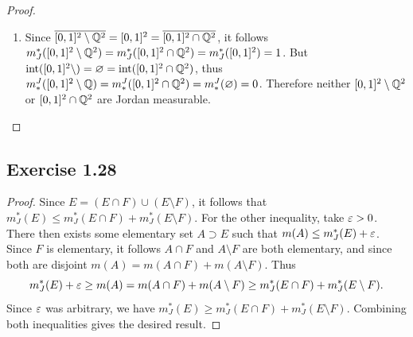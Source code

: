 \documentclass[hw_all.tex]{subfiles}
\begin{document}
\begin{proof}
\begin{enumerate}[label=\roman*)]
        \item 
            Since $\overline{[0,1]^2 \setminus \mathbb{Q}^2} = [0,1]^2 = \overline{[0,1]^2 \cap \mathbb{Q}^2}$, it follows $m_J^*([0,1]^2 \setminus \mathbb{Q}^2) = m_J^*([0,1]^2 \cap \mathbb{Q}^2) = m_J^*([0,1]^2) = 1$. But $\operatorname{int}([0,1]^2 \setminus) = \varnothing = \operatorname{int}([0,1]^2 \cap \mathbb{Q}^2)$, thus $m^J_*([0,1]^2 \setminus \mathbb{Q}) = m^J_*([0,1]^2 \cap \mathbb{Q}^2) = m^J_*(\varnothing) = 0$. Therefore neither $[0,1]^2 \setminus \mathbb{Q}^2$ or $[0,1]^2 \cap \mathbb{Q}^2$ are Jordan measurable.
    \end{enumerate}
\end{proof}

\subsection{Exercise 1.28}

\begin{proof}
    Since $E = (E \cap F) \cup (E \setminus F)$, it follows that $m_J^*(E) \leq m_J^*(E \cap F) + m_J^*(E \setminus F)$. For the other inequality, take $\varepsilon > 0$. There then exists some elementary set $A \supset E$ such that $m(A) \leq m_J^*(E) + \varepsilon$. Since $F$ is elementary, it follows $A \cap F$ and $A \setminus F$ are both elementary, and since both are disjoint $m(A) = m(A \cap F) + m(A \setminus F)$. Thus
    \[
        m_J^*(E) + \varepsilon \geq m(A) = m(A \cap F) + m(A \setminus F) \geq m_J^*(E \cap F) + m_J^*(E \setminus F)
    .\]
    Since $\varepsilon$ was arbitrary, we have $m_J^*(E) \geq m_J^*(E \cap F) + m_J^*(E \setminus F)$. Combining both inequalities gives the desired result.
\end{proof}
\end{document}
